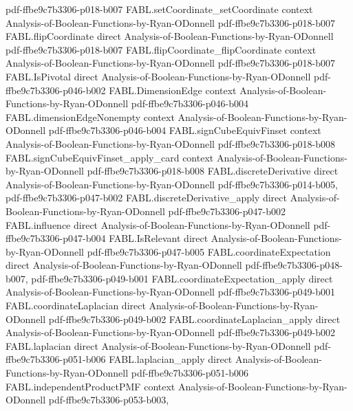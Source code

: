 \begin{theorem}
  {pdf-ffbe9c7b3306-p018-b007}
\proofstep
  {FABL.setCoordinate_setCoordinate}
  {context}
  {Analysis-of-Boolean-Functions-by-Ryan-ODonnell}
  {pdf-ffbe9c7b3306-p018-b007}
\proofstep
  {FABL.flipCoordinate}
  {direct}
  {Analysis-of-Boolean-Functions-by-Ryan-ODonnell}
  {pdf-ffbe9c7b3306-p018-b007}
\proofstep
  {FABL.flipCoordinate_flipCoordinate}
  {context}
  {Analysis-of-Boolean-Functions-by-Ryan-ODonnell}
  {pdf-ffbe9c7b3306-p018-b007}
\proofstep
  {FABL.IsPivotal}
  {direct}
  {Analysis-of-Boolean-Functions-by-Ryan-ODonnell}
  {pdf-ffbe9c7b3306-p046-b002}
\proofstep
  {FABL.DimensionEdge}
  {context}
  {Analysis-of-Boolean-Functions-by-Ryan-ODonnell}
  {pdf-ffbe9c7b3306-p046-b004}
\proofstep
  {FABL.dimensionEdgeNonempty}
  {context}
  {Analysis-of-Boolean-Functions-by-Ryan-ODonnell}
  {pdf-ffbe9c7b3306-p046-b004}
\proofstep
  {FABL.signCubeEquivFinset}
  {context}
  {Analysis-of-Boolean-Functions-by-Ryan-ODonnell}
  {pdf-ffbe9c7b3306-p018-b008}
\proofstep
  {FABL.signCubeEquivFinset_apply_card}
  {context}
  {Analysis-of-Boolean-Functions-by-Ryan-ODonnell}
  {pdf-ffbe9c7b3306-p018-b008}
\proofstep
  {FABL.discreteDerivative}
  {direct}
  {Analysis-of-Boolean-Functions-by-Ryan-ODonnell}
  {pdf-ffbe9c7b3306-p014-b005,
    pdf-ffbe9c7b3306-p047-b002}
\proofstep
  {FABL.discreteDerivative_apply}
  {direct}
  {Analysis-of-Boolean-Functions-by-Ryan-ODonnell}
  {pdf-ffbe9c7b3306-p047-b002}
\proofstep
  {FABL.influence}
  {direct}
  {Analysis-of-Boolean-Functions-by-Ryan-ODonnell}
  {pdf-ffbe9c7b3306-p047-b004}
\proofstep
  {FABL.IsRelevant}
  {direct}
  {Analysis-of-Boolean-Functions-by-Ryan-ODonnell}
  {pdf-ffbe9c7b3306-p047-b005}
\proofstep
  {FABL.coordinateExpectation}
  {direct}
  {Analysis-of-Boolean-Functions-by-Ryan-ODonnell}
  {pdf-ffbe9c7b3306-p048-b007,
    pdf-ffbe9c7b3306-p049-b001}
\proofstep
  {FABL.coordinateExpectation_apply}
  {direct}
  {Analysis-of-Boolean-Functions-by-Ryan-ODonnell}
  {pdf-ffbe9c7b3306-p049-b001}
\proofstep
  {FABL.coordinateLaplacian}
  {direct}
  {Analysis-of-Boolean-Functions-by-Ryan-ODonnell}
  {pdf-ffbe9c7b3306-p049-b002}
\proofstep
  {FABL.coordinateLaplacian_apply}
  {direct}
  {Analysis-of-Boolean-Functions-by-Ryan-ODonnell}
  {pdf-ffbe9c7b3306-p049-b002}
\proofstep
  {FABL.laplacian}
  {direct}
  {Analysis-of-Boolean-Functions-by-Ryan-ODonnell}
  {pdf-ffbe9c7b3306-p051-b006}
\proofstep
  {FABL.laplacian_apply}
  {direct}
  {Analysis-of-Boolean-Functions-by-Ryan-ODonnell}
  {pdf-ffbe9c7b3306-p051-b006}
\proofstep
  {FABL.independentProductPMF}
  {context}
  {Analysis-of-Boolean-Functions-by-Ryan-ODonnell}
  {pdf-ffbe9c7b3306-p053-b003,
}
\end{theorem}

